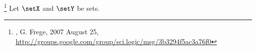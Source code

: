 
\begin{definition}
\footnote{
  ,
  G. Frege, 2007 August 25, \url{http://groups.google.com/group/sci.logic/msg/3b3294f5ac3a76f0}
  }
\label{def:AxB}
\label{def:cprod}
Let $\setX$ and $\setY$ be sets. 
\end{definition}


